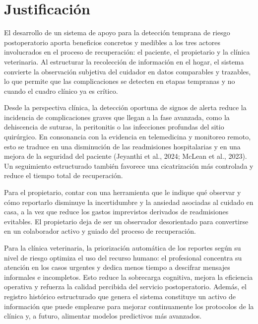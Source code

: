 \documentclass[stu, spanish]{apa7}
\begin{document}
\section{Justificaci\'{o}n}
El desarrollo de un sistema de apoyo para la detecci\'{o}n temprana de riesgo postoperatorio aporta beneficios concretos y medibles a los tres actores involucrados en el proceso de recuperaci\'{o}n: el paciente, el propietario y la cl\'{i}nica veterinaria. Al estructurar la recolecci\'{o}n de informaci\'{o}n en el hogar, el sistema convierte la observaci\'{o}n subjetiva del cuidador en datos comparables y trazables, lo que permite que las complicaciones se detecten en etapas tempranas y no cuando el cuadro cl\'{i}nico ya es cr\'{i}tico.

Desde la perspectiva cl\'{i}nica, la detecci\'{o}n oportuna de signos de alerta reduce la incidencia de complicaciones graves que llegan a la fase avanzada, como la dehiscencia de suturas, la peritonitis o las infecciones profundas del sitio quir\'{u}rgico. En consonancia con la evidencia en telemedicina y monitoreo remoto, esto se traduce en una disminuci\'{o}n de las readmisiones hospitalarias y en una mejora de la seguridad del paciente (Jeyanthi et al., 2024; McLean et al., 2023). Un seguimiento estructurado tambi\'{e}n favorece una cicatrizaci\'{o}n m\'{a}s controlada y reduce el tiempo total de recuperaci\'{o}n.

Para el propietario, contar con una herramienta que le indique qu\'{e} observar y c\'{o}mo reportarlo disminuye la incertidumbre y la ansiedad asociadas al cuidado en casa, a la vez que reduce los gastos imprevistos derivados de readmisiones evitables. El propietario deja de ser un observador desorientado para convertirse en un colaborador activo y guiado del proceso de recuperaci\'{o}n.

Para la cl\'{i}nica veterinaria, la priorizaci\'{o}n autom\'{a}tica de los reportes seg\'{u}n su nivel de riesgo optimiza el uso del recurso humano: el profesional concentra su atenci\'{o}n en los casos urgentes y dedica menos tiempo a descifrar mensajes informales e incompletos. Esto reduce la sobrecarga cognitiva, mejora la eficiencia operativa y refuerza la calidad percibida del servicio postoperatorio. Adem\'{a}s, el registro hist\'{o}rico estructurado que genera el sistema constituye un activo de informaci\'{o}n que puede emplearse para mejorar continuamente los protocolos de la cl\'{i}nica y, a futuro, alimentar modelos predictivos m\'{a}s avanzados.
\end{document}
